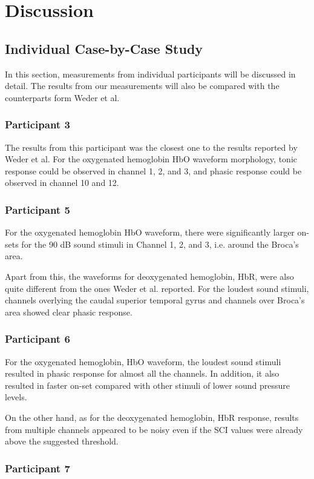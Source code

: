 \chapter{Discussion}

\section{ Individual Case-by-Case Study}
In this section, measurements from individual participants will be discussed in detail. The results from our measurements will also be compared with the counterparts form Weder et al.

\subsection {Participant 3}
The results from this participant was the closest one to the results reported by Weder et al. For the oxygenated hemoglobin HbO waveform morphology, tonic response could be observed in channel 1, 2, and 3, and phasic response could be observed in channel 10 and 12.

\subsection {Participant 5}
For the oxygenated hemoglobin HbO waveform, there were significantly larger on-sets for the 90 dB sound stimuli in Channel 1, 2, and 3, i.e. around the Broca's area.

Apart from this, the waveforms for deoxygenated hemoglobin, HbR, were also quite different from the ones Weder et al. reported. For the loudest sound stimuli, channels overlying the caudal superior temporal gyrus and channels over Broca's area showed clear phasic response. 

\subsection {Participant 6}

For the oxygenated hemoglobin, HbO waveform, the loudest sound stimuli resulted in phasic response for almost all the channels. In addition, it also resulted in faster on-set compared with other stimuli of lower sound pressure levels.

On the other hand, as for the deoxygenated hemoglobin, HbR response, results from multiple channels appeared to be noisy even if the SCI values were already above the suggested threshold.


\subsection {Participant 7}

